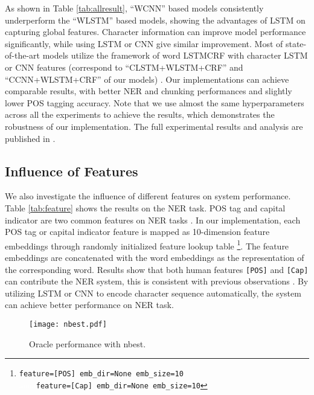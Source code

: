 \documentclass[11pt,a4paper]{article}
\begin{document}
As shown in Table \ref{tab:allresult}, ``WCNN'' based models consistently underperform the ``WLSTM'' based models, showing the advantages of LSTM on capturing global features. Character information can improve model performance significantly, while using LSTM or CNN give similar improvement. Most of state-of-the-art models utilize the framework of word LSTMCRF with character LSTM or CNN features (correspond to ``CLSTM+WLSTM+CRF'' and ``CCNN+WLSTM+CRF'' of our models) \cite{lample2016neural,ma2016end,yang2017transfer,peters2017semi}. Our implementations can achieve comparable results, with better NER and chunking performances and slightly lower POS tagging accuracy. Note that we use almost the same hyperparameters across all the experiments to achieve the results, which demonstrates the robustness of our implementation. The full experimental
results and analysis are published in .






\subsection{Influence of Features}
We also investigate the influence of different features on system performance. Table \ref{tab:feature} shows the results on the NER task. POS tag and capital indicator are two common features on NER tasks \cite{collobert2011natural,huang2015bidirectional,strubell2017fast}. In our implementation, each POS tag or capital indicator feature is mapped as 10-dimension feature embeddings through randomly initialized feature lookup table \footnote{\texttt{feature=[POS] emb\_dir=None emb\_size=10}\\ \textcolor{white}{aaaa}\texttt{feature=[Cap] emb\_dir=None emb\_size=10}}. The feature embeddings are concatenated with the word embeddings as the representation of the corresponding word. Results show that both human features \texttt{[POS]} and \texttt{[Cap]} can contribute the NER system, this is consistent with previous observations \cite{collobert2011natural,chiu2015named}. By utilizing LSTM or CNN to encode character sequence automatically, the system can achieve better performance on NER task.

\begin{figure}[!t]
  \centering 
    \texttt{[image: nbest.pdf]}
  \caption{Oracle performance with nbest.} 
  \label{fig:nbest} \end{figure}
\end{document}
